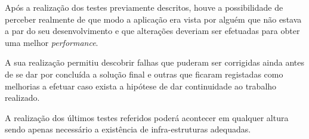 	Após a realização dos testes previamente descritos, houve a possibilidade de perceber realmente de que modo a aplicação era vista por alguém que não estava a par do seu desenvolvimento e que alterações deveriam ser efetuadas para obter uma melhor \textit{performance}.

	A sua realização permitiu descobrir falhas que puderam ser corrigidas ainda antes de se dar por concluída a solução final e outras que ficaram registadas como melhorias a efetuar caso exista a hipótese de dar continuidade ao trabalho realizado.

	A realização dos últimos testes referidos poderá acontecer em qualquer altura sendo apenas necessário a existência de infra-estruturas adequadas.



	

